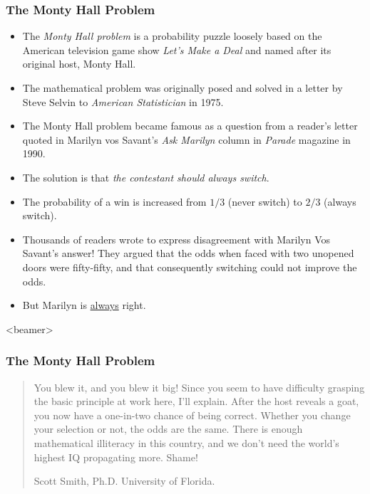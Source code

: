 \begin{frame}
\frametitle{The Monty Hall Problem}
\begin{itemize}
\item The \emph{Monty Hall problem} is a probability puzzle loosely based on the American television game show \textit{Let's Make a Deal} and named after its original host, Monty Hall. 
\item The mathematical problem was originally posed and solved in a letter by Steve Selvin to \textit{American Statistician} in 1975. 
\item The Monty Hall problem became famous as a question from a reader's letter quoted in Marilyn vos Savant's \textit{Ask Marilyn} column in \textit{Parade} magazine in 1990. 
\item The solution is that \emph{the contestant should always switch}. 
\item The probability of a win is increased from $1/3$ (never switch) to $2/3$ (always switch). 
\item Thousands of readers wrote to express disagreement with Marilyn Vos Savant's answer! They argued that the odds when faced with two unopened doors were fifty-fifty, and that consequently switching could not improve the odds.
\item But Marilyn is \underline{always} right.
\end{itemize}
\end{frame}


\begin{frame}<beamer>
\frametitle{The Monty Hall Problem}
\begin{quotation}\noindent
You blew it, and you blew it big! Since you seem to have difficulty grasping the basic principle at work here, I'll explain. After the host reveals a goat, you now have a one-in-two chance of being correct. Whether you change your selection or not, the odds are the same. There is enough mathematical illiteracy in this country, and we don't need the world's highest IQ propagating more. Shame!
\begin{signed}
Scott Smith, Ph.D. University of Florida.
\end{signed}
\end{quotation}
\end{frame}


